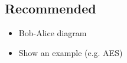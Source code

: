 
\subsection{Recommended}
\begin{itemize}
\item Bob-Alice diagram
\item Show an example (e.g. AES)
\end{itemize}
